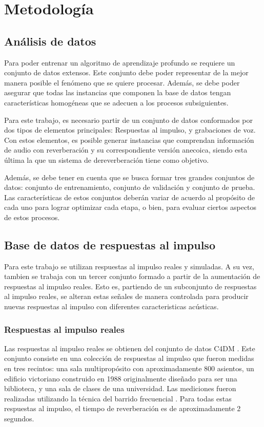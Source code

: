\section{Metodología}
\subsection{Análisis de datos}
Para poder entrenar un algoritmo de aprendizaje profundo se requiere un conjunto de datos extensos. Este conjunto debe poder representar de la mejor manera posible el fenómeno que se quiere procesar. Además, se debe poder asegurar que todas las instancias que componen la base de datos tengan características homogéneas que se adecuen a los procesos subsiguientes. 

Para este trabajo, es necesario partir de un conjunto de datos conformados por dos tipos de elementos principales: Respuestas al impulso, y grabaciones de voz. Con estos elementos, es posible generar instancias que comprendan información de audio con reverberación y su correspondiente versión anecoica, siendo esta última la que un sistema de dereverberación tiene como objetivo.

Además, se debe tener en cuenta que se busca formar tres grandes conjuntos de datos: conjunto de entrenamiento, conjunto de validación y conjunto de prueba. Las características de estos conjuntos deberán variar de acuerdo al propósito de cada uno para lograr optimizar cada etapa, o bien, para evaluar ciertos aspectos de estos procesos.    


\subsection{Base de datos de respuestas al impulso}

Para este trabajo se utilizan respuestas al impulso reales y simuladas. A su vez, tambien se trabaja con un tercer conjunto formado a partir de la aumentación de respuestas al impulso reales. Esto es, partiendo de un subconjunto de respuestas al impulso reales, se alteran estas señales de manera controlada para producir nuevas respuestas al impulso con diferentes caracteristicas acústicas.

\subsubsection{Respuestas al impulso reales}

Las respuestas al impulso reales se obtienen del conjunto de datos C4DM \cite{rir_reales}. Este conjunto consiste en una colección de respuestas al impulso que fueron medidas en tres recintos: una sala multipropósito con aproximadamente 800 asientos, un edificio victoriano construido en 1988 originalmente diseñado para ser una biblioteca, y una sala de clases de una universidad. Las mediciones fueron realizadas utilizando la técnica del barrido frecuencial \cite{sinesweep}. Para todas estas respuestas al impulso, el tiempo de reverberación es de aproximadamente 2 segundos. 

